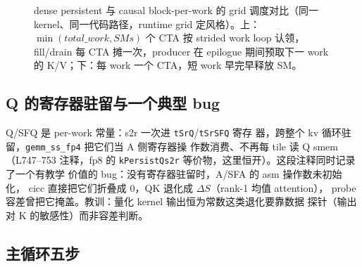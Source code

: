 \begin{figure}[H]
\caption{dense persistent 与 causal block-per-work 的 grid 调度对比（同一
kernel、同一代码路径，runtime grid 定风格）。上：$\min(total\_work,SMs)$ 个 CTA
按 strided work loop 认领，fill/drain 每 CTA 摊一次，producer 在 epilogue
期间预取下一 work 的 K/V；下：每 work 一个 CTA，短 work 早完早释放 SM。}
\label{fig:32-grid-sched}
\end{figure}

\subsection{Q 的寄存器驻留与一个典型 bug}

Q/SFQ 是 per-work 常量：s2r 一次进 \texttt{tSrQ}/\texttt{tSrSFQ} 寄存
器，跨整个 kv 循环驻留，\texttt{gemm\_ss\_fp4} 把它们当 A 侧寄存器操
作数消费、不再每 tile 读 Q smem（L747--753 注释，fp8 的
\texttt{kPersistQs2r} 等价物，这里恒开）。这段注释同时记录了一个有教学
价值的 bug：没有寄存器驻留时，A/SFA 的 asm 操作数未初始化，
cicc 直接把它们折叠成 0，QK 退化成 $\Delta S$（rank-1 均值 attention），
probe 容差曾把它掩盖。教训：量化 kernel 输出恒为常数这类退化要靠数据
探针（输出对 K 的敏感性）而非容差判断。

\subsection{主循环五步}

